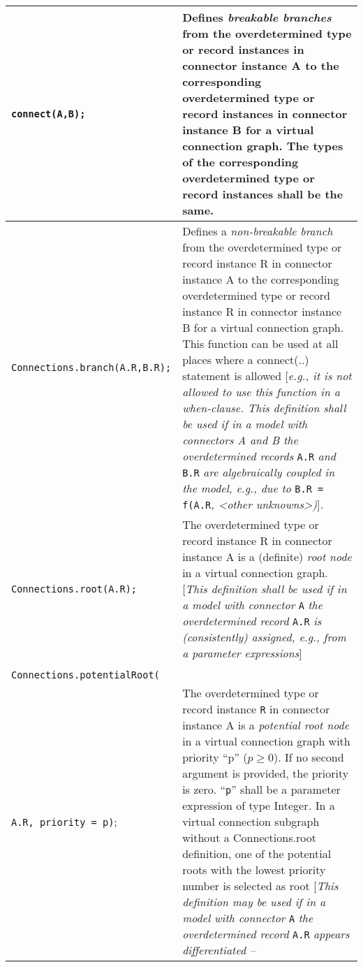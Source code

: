 \begin{longtable}[]{|p{5.1cm}|p{10cm}|}
\hline \endhead
\lstinline!connect(A,B);! & Defines \emph{breakable branches} from the
overdetermined type or record instances in connector instance A to the
corresponding overdetermined type or record instances in connector
instance B for a virtual connection graph. The types of the
corresponding overdetermined type or record instances shall be the
same.\\ \hline
\lstinline!Connections.branch(A.R,B.R);! & Defines a \emph{non-breakable branch}
from the overdetermined type or record instance R in connector instance
A to the corresponding overdetermined type or record instance R in
connector instance B for a virtual connection graph. This function can
be used at all places where a connect(..) statement is allowed
{[}\emph{e.g., it is not allowed to use this function in a when-clause.
This definition shall be used if in a model with connectors A and B the
overdetermined records} \lstinline!A.R! \emph{and} \lstinline!B.R! \emph{are algebraically
coupled in the model, e.g., due to} \lstinline!B.R = f(A.R!\emph{, \textless{}other
unknowns\textgreater{})}{]}\emph{.}\\ \hline
\lstinline!Connections.root(A.R);! & The overdetermined type or record instance R in
connector instance A is a (definite) \emph{root node} in a virtual
connection graph. {[}\emph{This definition shall be used if in a model
with connector} \lstinline!A! \emph{the overdetermined record} \lstinline!A.R! \emph{is
(consistently) assigned, e.g., from a parameter
expressions}{]}\\ \hline
\begin{tabular}{@{}p{5.1cm}@{}}
\lstinline!Connections.potentialRoot(A.R);!\\
\lstinline!Connections.potentialRoot(!\\
\lstinline!A.R, priority = p)!;
\end{tabular}
& The overdetermined type or record instance \lstinline!R! in connector instance A is
a \emph{potential root node} in a virtual connection graph with priority
``p'' ($p\ge 0$). If no second argument is provided, the priority is zero.
``\lstinline!p!'' shall be a parameter expression of type Integer\emph{.} In a
virtual connection subgraph without a Connections.root definition, one
of the potential roots with the lowest priority number is selected as
root {[}\emph{This definition may be used if in a model with connector}
\lstinline!A! \emph{the overdetermined record} \lstinline!A.R! \emph{appears differentiated --}

\end{longtable}
